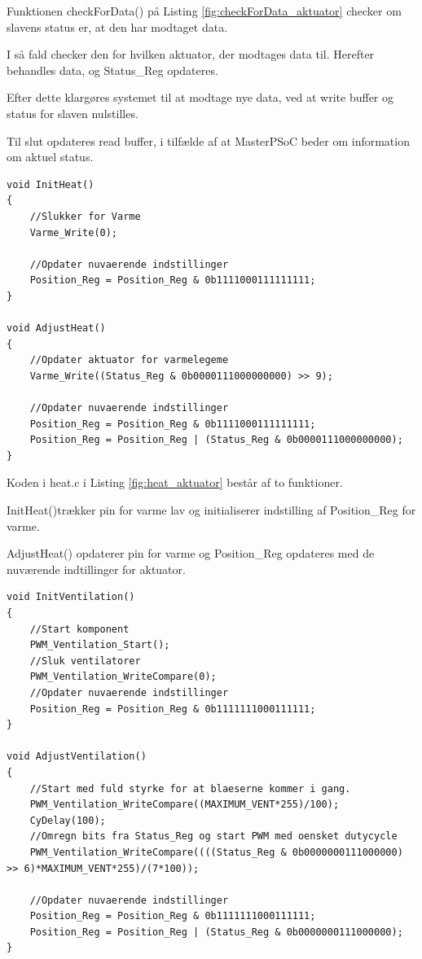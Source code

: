 \clearpage

Funktionen checkForData() på Listing \ref{fig:checkForData_aktuator} checker om slavens status er, at den har modtaget data. 

I så fald checker den for hvilken aktuator, der modtages data til.
Herefter behandles data, og Status\_Reg opdateres.

Efter dette klargøres systemet til at modtage nye data, ved at write buffer og status for slaven nulstilles.

Til slut opdateres read buffer, i tilfælde af at MasterPSoC beder om information om aktuel status. 
\newline
\begin{lstlisting}[caption=Udsnit af heat.c for PSoC4 i Aktuator, label=fig:heat_aktuator]
void InitHeat()
{   
    //Slukker for Varme
    Varme_Write(0);
    
    //Opdater nuvaerende indstillinger
    Position_Reg = Position_Reg & 0b1111000111111111;
}

void AdjustHeat()
{
    //Opdater aktuator for varmelegeme
    Varme_Write((Status_Reg & 0b0000111000000000) >> 9);
    
    //Opdater nuvaerende indstillinger
    Position_Reg = Position_Reg & 0b1111000111111111;
    Position_Reg = Position_Reg | (Status_Reg & 0b0000111000000000);
}
\end{lstlisting}

Koden i heat.c i Listing \ref{fig:heat_aktuator} består af to funktioner. 

InitHeat()trækker pin for varme lav og initialiserer indstilling af Position\_Reg for varme.

AdjustHeat() opdaterer pin for varme og Position\_Reg opdateres med de nuværende indtillinger for aktuator. 

\clearpage

\begin{lstlisting}[caption=Udsnit af ventilation.c for PSoC4 i Aktuator, label=fig:ventilation_aktuator]
void InitVentilation()
{
    //Start komponent
    PWM_Ventilation_Start();
    //Sluk ventilatorer
    PWM_Ventilation_WriteCompare(0);
    //Opdater nuvaerende indstillinger
    Position_Reg = Position_Reg & 0b1111111000111111;
}

void AdjustVentilation()
{
    //Start med fuld styrke for at blaeserne kommer i gang.
    PWM_Ventilation_WriteCompare((MAXIMUM_VENT*255)/100);
    CyDelay(100);
    //Omregn bits fra Status_Reg og start PWM med oensket dutycycle
    PWM_Ventilation_WriteCompare((((Status_Reg & 0b0000000111000000) >> 6)*MAXIMUM_VENT*255)/(7*100));
    
    //Opdater nuvaerende indstillinger
    Position_Reg = Position_Reg & 0b1111111000111111;
    Position_Reg = Position_Reg | (Status_Reg & 0b0000000111000000);
}
\end{lstlisting}

